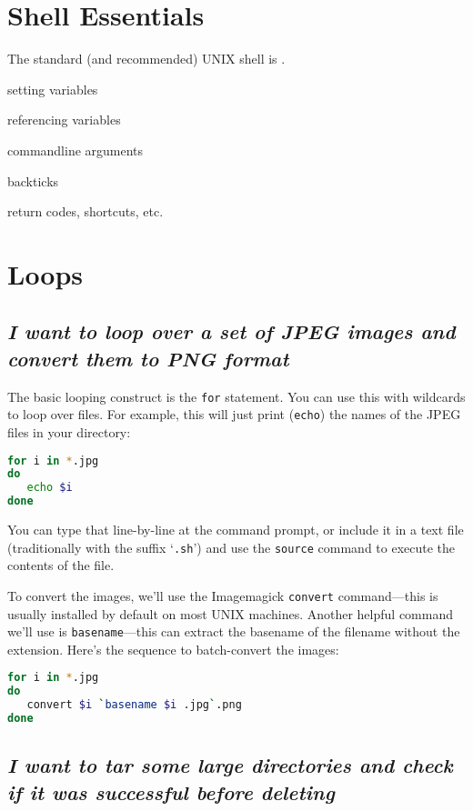\section{Shell Essentials}

The standard (and recommended) UNIX shell is \bash.

setting variables

referencing variables

commandline arguments

backticks

return codes, shortcuts, etc.


\section{Loops}

\subsection{\em I want to loop over a set of JPEG images and convert them to PNG format}

The basic looping construct is the {\tt for} statement.  You can use this with wildcards to
loop over files.  For example, this will just print ({\tt echo}) the names of the JPEG
files in your directory:

\begin{lstlisting}[language={bash},upquote=true]
for i in *.jpg
do
   echo $i
done
\end{lstlisting}

You can type that line-by-line at the command prompt, or include it in
a text file (traditionally with the suffix `{\tt .sh}') and use the
{\tt source} command to execute the contents of the file.

To convert the images, we'll use the Imagemagick {\tt convert}
command---this is usually installed by default on most UNIX machines.
Another helpful command we'll use is {\tt basename}---this can extract
the basename of the filename without the extension.  Here's the
sequence to batch-convert the images:

\begin{lstlisting}[language={bash}]
for i in *.jpg
do
   convert $i `basename $i .jpg`.png
done
\end{lstlisting}


\subsection{\em I want to tar some large directories and check if it was successful before deleting}

